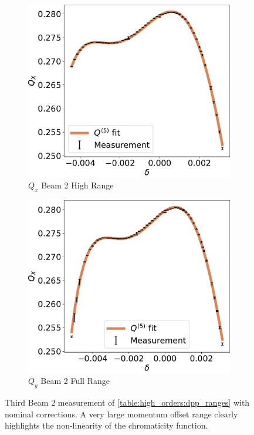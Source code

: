 \begin{figure}[!htb]
    \begin{subfigure}{0.49\textwidth}
        \centering
        \includegraphics[width=\textwidth]{./images/chromaticity_further/q5_range/Beam2_Qx_full_but_not_quite.pdf}
        \caption{$Q_x$ Beam 2 High Range}
        \label{}
    \end{subfigure}
    \hfill
    \begin{subfigure}{0.49\textwidth}
        \centering
        \includegraphics[width=\textwidth]{./images/chromaticity_further/q5_range/Beam2_Qx_full.pdf}
        \caption{$Q_y$ Beam 2 Full Range}
        \label{}
    \end{subfigure}
    \caption{Third Beam 2 measurement of \cref{table:high_orders:dpp_ranges} with nominal
    corrections. A very large momentum offset range clearly highlights the non-linearity of the
    chromaticity function.}
    \label{fig:high_orders:chroma_nominal_correction_full_range}
\end{figure}

